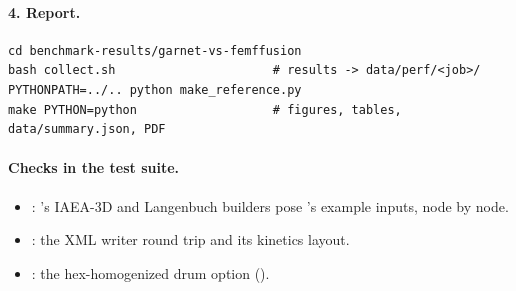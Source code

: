 \paragraph{4. Report.}
\begin{verbatim}
cd benchmark-results/garnet-vs-femffusion
bash collect.sh                      # results -> data/perf/<job>/
PYTHONPATH=../.. python make_reference.py
make PYTHON=python                   # figures, tables, data/summary.json, PDF
\end{verbatim}

\paragraph{Checks in the test suite.}
\begin{itemize}
\item {}: \garnet's
  IAEA-3D and Langenbuch builders pose \ffn's example inputs, node by node.
\item {}: the XML writer round
  trip and its kinetics layout.
\item {}: the hex-homogenized drum option
  ().
\end{itemize}
